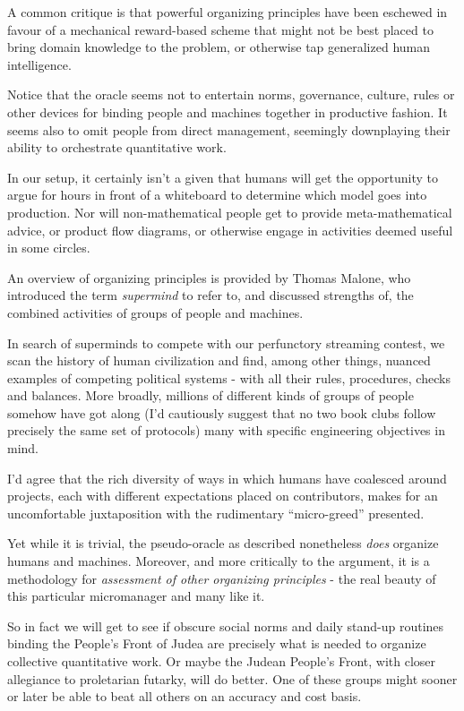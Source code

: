 A common critique is that powerful organizing principles have been eschewed in favour of a mechanical reward-based scheme that might not be best placed to bring domain knowledge to the problem, or otherwise tap generalized human intelligence. 

Notice that the oracle seems not to entertain norms, governance, culture, rules or other devices for binding people and machines together in productive fashion. It seems also to omit people from direct management, seemingly downplaying their ability to orchestrate quantitative work.  

In our setup, it certainly isn't a given that humans will get the opportunity to argue for hours in front of a whiteboard to determine which model goes into production. Nor will non-mathematical people get to provide meta-mathematical advice, or product flow diagrams, or otherwise engage in activities deemed useful in some circles. 

An overview of organizing principles is provided by Thomas Malone, who introduced the term {\em supermind} to refer to, and discussed strengths of, the combined activities of groups of people and machines. 

In search of superminds to compete with our perfunctory streaming contest, we scan the history of human civilization and find, among other things, nuanced examples of competing political systems - with all their rules, procedures, checks and balances. More broadly, millions of different kinds of groups of people somehow have got along (I'd cautiously suggest that no two book clubs follow precisely the same set of protocols) many with specific engineering objectives in mind. 

I'd agree that the rich diversity of ways in which humans have coalesced around projects, each with different expectations placed on contributors,  makes for an uncomfortable juxtaposition with the rudimentary ``micro-greed'' presented. 


Yet while it is trivial, the pseudo-oracle as described nonetheless {\em does} organize humans and machines. Moreover, and more critically to the argument, it is a methodology for {\em assessment of other organizing principles} - the real beauty of this particular micromanager and many like it. 

So in fact we will get to see if obscure social norms and daily stand-up routines binding the People's Front of Judea are precisely what is needed to organize collective quantitative work. Or maybe the Judean People's Front, with closer allegiance to proletarian futarky, will do better. One of these groups might sooner or later be able to beat all others on an accuracy and cost basis. 

